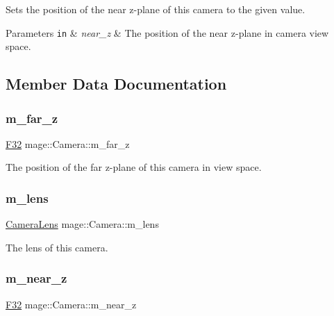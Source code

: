 Sets the position of the near z-\/plane of this camera to the given value.


\begin{DoxyParams}[1]{Parameters}
\mbox{\tt in}  & {\em near\+\_\+z} & The position of the near z-\/plane in camera view space. \\
\hline
\end{DoxyParams}


\subsection{Member Data Documentation}
\hypertarget{classmage_1_1_camera_a1073445c77b3224cd62613ae83853fe3}{}\label{classmage_1_1_camera_a1073445c77b3224cd62613ae83853fe3} 
\subsubsection{\texorpdfstring{m\+\_\+far\+\_\+z}{m\_far\_z}}
{\footnotesize\ttfamily \hyperlink{namespacemage_aa97e833b45f06d60a0a9c4fc22ae02c0}{F32} mage\+::\+Camera\+::m\+\_\+far\+\_\+z\hspace{0.3cm}{\ttfamily [private]}}

The position of the far z-\/plane of this camera in view space. \hypertarget{classmage_1_1_camera_a1fe77374724cc14506cecbc59fe77c53}{}\label{classmage_1_1_camera_a1fe77374724cc14506cecbc59fe77c53} 
\subsubsection{\texorpdfstring{m\+\_\+lens}{m\_lens}}
{\footnotesize\ttfamily \hyperlink{classmage_1_1_camera_lens}{Camera\+Lens} mage\+::\+Camera\+::m\+\_\+lens\hspace{0.3cm}{\ttfamily [private]}}

The lens of this camera. \hypertarget{classmage_1_1_camera_a8ae2c8fbe94cb6f8c4cd4a2811900b83}{}\label{classmage_1_1_camera_a8ae2c8fbe94cb6f8c4cd4a2811900b83} 
\subsubsection{\texorpdfstring{m\+\_\+near\+\_\+z}{m\_near\_z}}
{\footnotesize\ttfamily \hyperlink{namespacemage_aa97e833b45f06d60a0a9c4fc22ae02c0}{F32} mage\+::\+Camera\+::m\+\_\+near\+\_\+z\hspace{0.3cm}{\ttfamily [private]}}

